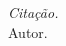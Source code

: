 
\chapter*{}
\vspace{15cm}
\begin{flushright}
	\textit
	{
		Citação.
	}\medskip\\ 
	Autor.
\end{flushright}